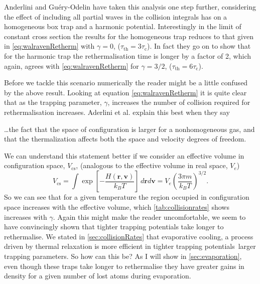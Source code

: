 Anderlini and Gu\'ery-Odelin \cite{Anderlini2006} have taken this analysis one step further, considering the effect of including all partial waves in the collision integrals has on a homogeneous box trap and a harmonic potential.
Interestingly in the limit of constant cross section the results for the homogeneous trap reduces to that given in \autoref{eq:walravenRetherm} with $\gamma=0$, ($\tau_\mathrm{th}=3\tau_\mathrm{c}$).
In fact they go on to show that for the harmonic trap the rethermalisation time is longer by a factor of 2, which again, agrees with \autoref{eq:walravenRetherm} for $\gamma=3/2$, ($\tau_\mathrm{th}=6\tau_\mathrm{c}$).

Before we tackle this scenario numerically the reader might be a little confused by the above result. 
Looking at equation \autoref{eq:walravenRetherm} it is quite clear that as the trapping parameter, $\gamma$, increases the number of collision required for rethermalisation increases.
Aderlini et al. explain this best when they say
\begin{displayquote}
    \dots the fact that the space of configuration is larger for a nonhomogeneous gas, and that the thermalization affects both the space and velocity degrees of freedom.
\end{displayquote}
We can understand this statement better if we consider an effective volume in configuration space, $V_\mathrm{cs}$, (analogous to the effective volume in real space, $V_{e}$)
\begin{equation}
    V_\mathrm{cs} = \int \exp\left[ -\frac{H( \mathbf{r}, \mathbf{v})}{k_B T}\right]\,d\mathbf{r}d\mathbf{v} = V_e \left(\frac{3\pi m}{k_B T}\right)^{3/2}.
\end{equation}
So we can see that for a given temperature the region occupied in configuration space increases with the effective volume, which \autoref{tab:collisionrates} shows increases with $\gamma$.
Again this might make the reader uncomfortable, we seem to have convincingly shown that tighter trapping potentials take longer to rethermalise. 
We stated in \autoref{sec:collisionRates} that evaporative cooling, a process driven by thermal relaxation is more efficient in tighter trapping potentials \ie\,larger trapping parameters.
So how can this be?
As I will show in \autoref{sec:evaporation}, even though these traps take longer to rethermalise they have greater gains in density for a given number of lost atoms during evaporation.


